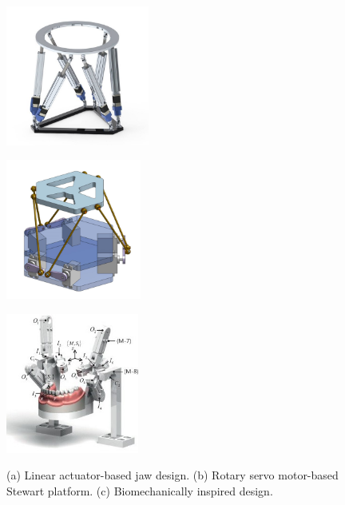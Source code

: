 \begin{figure}[H]
\centering
\begin{minipage}{.3\textwidth}
  \centering
  \includegraphics[height=4.6cm]{figures/linear_stewart_platform_2.jpg}
  \subcaption{}
  \label{fig:linear_stewart_platform}
\end{minipage}
\begin{minipage}{.3\textwidth}
  \centering
  \includegraphics[height=4.6cm]{figures/rotary-stewart-plateform.jpg}
  \subcaption{}
  \label{fig:rotary_stewart_platform}
\end{minipage}
\begin{minipage}{.3\textwidth}
  \centering
  \includegraphics[height=4.6cm]{figures/6dof_jaw_cad.jpg}
  \subcaption{}
  \label{fig:biomechanically_inspired_design}
\end{minipage}
\caption{(a) Linear actuator-based jaw design. (b) Rotary servo motor-based Stewart platform. (c) Biomechanically inspired design\cite{ChewingRobotLinearActuator}.}
\label{fig:stewart_platforms}
\end{figure}


